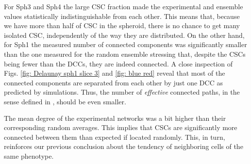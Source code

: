 \documentclass[fleqn,10pt]{wlscirep}
\begin{document}
For {\textsf Sph3} and {\textsf Sph4} the large CSC fraction made the experimental and ensemble values statistically indistinguishable from each other. This means that, because we have more than half of CSC in the spheroid, there is no chance to get many isolated CSC, independently of the way they are distributed. 
On the other hand, for {\textsf Sph1} the measured number of connected components was significantly smaller than the one measured for the random ensemble stressing that, despite the CSCs being fewer than the DCCs, they are indeed connected. A close inspection of Figs. \ref{fig: Delaunay sph1 slice 3} and \ref{fig: blue red} reveal that most of the connected components are separated from each other by just one DCC as predicted by simulations. Thus, the number of \emph{effective} connected paths, in the sense defined in \cite{barberis2021percolation}, should be even smaller.

The mean degree of the experimental networks was a bit higher than their corresponding random averages. This implies that CSCs are significantly more connected between them than expected if located randomly. This, in turn, reinforces our previous conclusion about the tendency of neighboring cells of the same phenotype. 
% 
\end{document}
